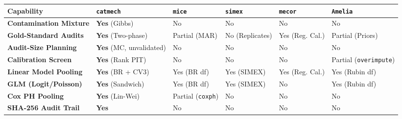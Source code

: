 \documentclass[
]{article}
\newcounter{none} %
\begin{document}
{\def\LTcaptype{none} %
\begin{longtable}[]{@{}
  >{\raggedright\arraybackslash}p{}
  >{\centering\arraybackslash}p{}
  >{\centering\arraybackslash}p{}
  >{\centering\arraybackslash}p{}
  >{\centering\arraybackslash}p{}
  >{\centering\arraybackslash}p{}@{}}
\toprule\noalign{}
\begin{minipage}[b]{\linewidth}\raggedright
Capability
\end{minipage} & \begin{minipage}[b]{\linewidth}\centering
\texttt{catmech}
\end{minipage} & \begin{minipage}[b]{\linewidth}\centering
\texttt{mice} \citep{vanbuuren2011mice}
\end{minipage} & \begin{minipage}[b]{\linewidth}\centering
\texttt{simex} \citep{leeder2008simex}
\end{minipage} & \begin{minipage}[b]{\linewidth}\centering
\texttt{mecor} \citep{nab2021mecor}
\end{minipage} & \begin{minipage}[b]{\linewidth}\centering
\texttt{Amelia} \citep{honaker2011amelia}
\end{minipage} \\
\midrule\noalign{}
\endhead
\bottomrule\noalign{}
\endlastfoot
\textbf{Contamination Mixture} & \textbf{Yes} (Gibbs) & No & No & No &
No \\
\textbf{Gold-Standard Audits} & \textbf{Yes} (Two-phase) & Partial (MAR)
& No (Replicates) & Yes (Reg. Cal.) & Partial (Priors) \\
\textbf{Audit-Size Planning} & \textbf{Yes} (MC, unvalidated) & No & No
& No & No \\
\textbf{Calibration Screen} & \textbf{Yes} (Rank PIT) & No & No & No &
Partial (\texttt{overimpute}) \\
\textbf{Linear Model Pooling} & \textbf{Yes} (BR + CV3) & Yes (BR df) &
Yes (SIMEX) & Yes (Reg. Cal.) & Yes (Rubin df) \\
\textbf{GLM (Logit/Poisson)} & \textbf{Yes} (Sandwich) & Yes (BR df) &
Yes (SIMEX) & No & Yes (Rubin df) \\
\textbf{Cox PH Pooling} & \textbf{Yes} (Lin-Wei) & Partial
(\texttt{coxph}) & No & No & No \\
\textbf{SHA-256 Audit Trail} & \textbf{Yes} & No & No & No & No \\
\end{longtable}
}
\end{document}
